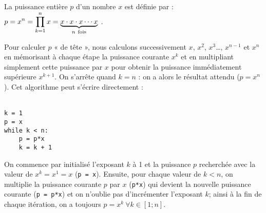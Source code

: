 \begin{ex}\label{ex:puissance}
La puissance entière $p$ d'un nombre $x$ est définie par :
$\displaystyle p = x^n = \prod_{k=1}^{n} x = \underbrace{x\cdot x\cdot x\cdots x}_{n\ \rm fois}$ .
\end{ex}
\noindent Pour calculer $p$ « de tête », nous calculons successivement $x$, $x^2$, $x^3$\ldots,
$x^{n-1}$ et $x^n$ en mémorisant à chaque étape la puissance courante $x^k$ et en multipliant
simplement cette puissance par $x$ pour obtenir la puissance immédiatement supérieure $x^{k+1}$.
On s'arrête quand $k = n$ : on a alors le résultat attendu ($p = x^n$).
Cet algorithme peut s'écrire directement :\\
\mbox{}\ \ \begin{py}{3cm}
\begin{verbatim}
k = 1
p = x
while k < n:
    p = p*x
    k = k + 1
\end{verbatim}
\end{py}
\hfill
\begin{minipage}[t]{12cm}\footnotesize
On commence par initialisé l'exposant $k$ à 1 et la puissance $p$ recherchée 
avec la valeur de $x^k = x^1 = x$ ({\tt p = x}). 
Ensuite, pour chaque valeur de $k < n$,
on multiplie la puissance courante $p$ par $x$ ({\tt p*x}) qui devient la nouvelle
puissance courante ({\tt p = p*x}) et on n'oublie pas d'incrémenter l'exposant $k$; ainsi
à la fin de chaque itération, on a toujours $p = x^k\ \forall k \in [1;n]$.
\end{minipage}\\

